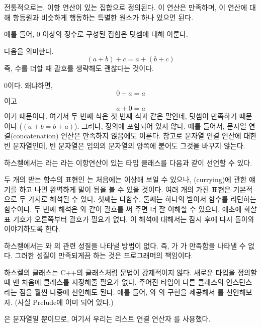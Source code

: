 전통적으로는, \trMonoid\는 이항 연산이 있는 집합으로 정의된다. 이 연산은 \trAssociativity\를 만족하며, 
이 연산에 대해 항등원과 비슷하게 행동하는 특별한 원소가 하나 있으면 된다.

예를 들어, 0 이상의 정수로 구성된 집합은 덧셈에 대해 \trMonoid\를 이룬다.

 다음을 의미한다.
\[(a + b) + c = a + (b + c)\]
즉, 수를 더할 때 괄호를 생략해도 괜찮다는 것이다.

\trNeutralElement\는 0이다. 왜냐하면,
\[0 + a = a\]
이고
\[a + 0 = a\]
이기 때문이다. 여기서 두 번째 식은 첫 번째 식과 같은 말인데, 덧셈이 \trCommutativity\를 만족하기 때문이다 ($(a + b
= b + a)$).
그러나, \trCommutativity\은  정의에 포함되어 있지 않다.
예를 들어서, 문자열 연결(concatenation) 연산은 \trCommutativity\를 만족하지 않음에도 \trMonoid\를 이룬다.
참고로 문자열 연결 연산에 대한 \trNeutralElement\는 빈 문자열인데, 빈 문자열은 임의의 문자열의 양쪽에 붙어도 그것을 바꾸지 않는다.

하스켈에서는 라는 \trNeutralElement\와 라는 이항연산이 있는 \trMonoid 타입 클래스를 다음과 같이 선언할 수 있다. 

두 개의 \trArgument\를 받는 함수의 표현인
는 처음에는 이상해 보일 수 있으나,
\trCurrying(currying)에 관한 얘기를 하고 나면 완벽하게 말이 됨을 볼 수 있을 것이다. 
여러 개의 \trArrow\를 가진 표현은 기본적으로 두 가지로 해석될 수 있다. 첫째는 다\trArgument 함수, 
둘째는 하나의 \trArgument\를 받아서 함수를 리턴하는 함수이다. 
두 번째 해석은 와 같이 괄호를 써 주면 더 잘 이해할 수 있으나, 
애초에 화살표 기호가 오른쪽부터  괄호가 필요가 없다.
이 해석에 대해서는 잠시 후에 다시 돌아와 이야기하도록 한다.

하스켈에서는 와 의 \trMonoid 관련 성질을 나타낼 방법이 없다.
즉, 가  가 \trAssociativity\을 만족함을 나타낼 수 없다.
그러한 성질이 만족되게끔 하는 것은 프로그래머의 책임이다.

하스켈의 클래스는 C++의 클래스처럼 문법이 강제적이지 않다.
새로운 타입을 정의할 때 맨 처음에 클래스를 지정해줄 필요가 없다. 
주어진 타입이 다른 클래스의 인스턴스라는 점을 훨씬 나중에 선언해도 된다.
예를 들어, 와 의 구현을 제공해서 를 \trMonoid\로 선언해보자.
(사실 Prelude에 이미 되어 있다.)

은 문자열일 뿐이므로, 여기서 우리는 리스트 연결 연산자 \code{(++)}를 사용했다.

